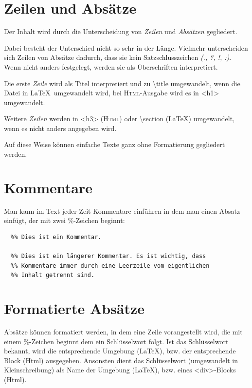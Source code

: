 \documentclass{scrartcl}
\begin{document}
\section{Zeilen und Absätze}

{Der Inhalt wird durch die Unterscheidung von \emph{Zeilen} und
\emph{Absätzen} gegliedert.\\}

{Dabei besteht der Unterschied nicht so sehr in der
Länge. Vielmehr unterscheiden sich Zeilen von Absätze
dadurch, dass sie kein Satzschlusszeichen \emph{(., ?, !, :)}.
Wenn nicht anders festgelegt, werden sie als Überschriften
interpretiert.\\}

{Die erste \emph{Zeile} wird als Titel interpretiert und zu \textbackslash title
umgewandelt, wenn die Datei in \LaTeX\  umgewandelt wird, bei
\textsc{Html}-Ausgabe wird es in <h1> umgewandelt.\\}

{Weitere \emph{Zeilen} werden in <h3> (\textsc{Html}) oder \textbackslash section
(LaTeX) umgewandelt, wenn es nicht anders angegeben wird.\\}

{Auf diese Weise können einfache Texte ganz ohne Formatierung
gegliedert werden.\\}

\section{Kommentare}

{Man kann im Text jeder Zeit Kommentare einführen in dem man einen Absatz einfügt, der mit zwei \%-Zeichen beginnt:\\}

\begin{verbatim}
  %% Dies ist ein Kommentar.

  %% Dies ist ein längerer Kommentar. Es ist wichtig, dass
  %% Kommentare immer durch eine Leerzeile vom eigentlichen
  %% Inhalt getrennt sind.
\end{verbatim}




\section{Formatierte Absätze}

{Absätze können formatiert werden, in dem eine Zeile
vorangestellt wird, die mit einem \%-Zeichen beginnt dem ein
Schlüsselwort folgt. Ist das Schlüsselwort bekannt, wird
die entsprechende Umgebung (LaTeX), bzw. der entsprechende
Block (Html) ausgegeben. Ansonsten dient das Schlüsselwort
(umgewandelt in Kleinschreibung) als Name der Umgebung
(LaTeX), bzw. eines <div>-Blocks (Html).\\}
\end{document}
